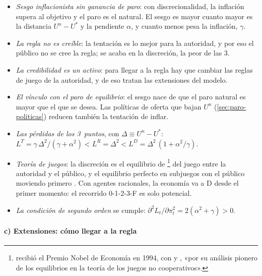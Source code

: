 \documentclass[11pt]{article}
\begin{document}
\begin{itemize}
\item \emph{Sesgo inflacionista sin ganancia de paro}: con discrecionalidad, la inflación supera al objetivo y el paro es el natural. El sesgo es mayor cuanto mayor es la distancia $U^n-U^*$ y la pendiente $\alpha$, y cuanto menos pesa la inflación, $\gamma$.
\item \emph{La regla no es creíble}: la tentación es lo mejor para la autoridad, y por eso el público no se cree la regla; se acaba en la discreción, la peor de las 3.
\item \emph{La credibilidad es un activo}: para llegar a la regla hay que cambiar las reglas de juego de la autoridad, y de eso tratan las extensiones del modelo.
\item \emph{El vínculo con el paro de equilibrio}: el sesgo nace de que el paro natural es mayor que el que se desea. Las políticas de oferta que bajan $U^n$ (\ref{sec:paro-politicas}) reducen también la tentación de inflar.
\end{itemize}

\begin{anotaciones}
\begin{itemize}
\item \emph{Las pérdidas de los 3~puntos}, con $\Delta\equiv U^n-U^*$: $L^T=\gamma\,\Delta^2/(\gamma+\alpha^2)<L^R=\Delta^2<L^D=\Delta^2\,(1+\alpha^2/\gamma)$.
\item \emph{Teoría de juegos}: la discreción es el equilibrio de \footnote{ recibió el Premio Nobel de Economía en 1994, con  y , «por su análisis pionero de los equilibrios en la teoría de los juegos no cooperativos»\nocite{Nobel1994Nash}.} del juego entre la autoridad y el público, y el equilibrio perfecto en subjuegos con el público moviendo primero . Con agentes racionales, la economía va a D desde el primer momento: el recorrido 0-1-2-3-F es solo potencial.
\item \emph{La condición de segundo orden} se cumple: $\partial^2L_t/\partial\pi_t^2=2(\alpha^2+\gamma)>0$.
\end{itemize}
\end{anotaciones}

\paragraph{c) Extensiones: cómo llegar a la regla}
\end{document}
